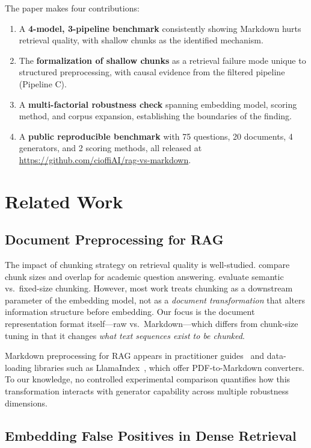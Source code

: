 \documentclass{article}
\begin{document}
The paper makes four contributions:

\begin{enumerate}
    \item A \textbf{4-model, 3-pipeline benchmark} consistently showing Markdown hurts retrieval quality, with shallow chunks as the identified mechanism.
    \item The \textbf{formalization of shallow chunks} as a retrieval failure mode unique to structured preprocessing, with causal evidence from the filtered pipeline (Pipeline C).
    \item A \textbf{multi-factorial robustness check} spanning embedding model, scoring method, and corpus expansion, establishing the boundaries of the finding.
    \item A \textbf{public reproducible benchmark} with 75 questions, 20 documents, 4 generators, and 2 scoring methods, all released at \url{https://github.com/cioffiAI/rag-vs-markdown}.
\end{enumerate}

\section{Related Work}

\subsection{Document Preprocessing for RAG}

The impact of chunking strategy on retrieval quality is well-studied. \citet{gao2023retrieval} compare chunk sizes and overlap for academic question answering. \citet{chen2024dense} evaluate semantic vs.\ fixed-size chunking. However, most work treats chunking as a downstream parameter of the embedding model, not as a \emph{document transformation} that alters information structure before embedding. Our focus is the document representation format itself---raw vs.\ Markdown---which differs from chunk-size tuning in that it changes \emph{what text sequences exist to be chunked}.

Markdown preprocessing for RAG appears in practitioner guides~\citep{openai2024rag,cursor2024} and data-loading libraries such as LlamaIndex~\citep{llamaindex}, which offer PDF-to-Markdown converters. To our knowledge, no controlled experimental comparison quantifies how this transformation interacts with generator capability across multiple robustness dimensions.

\subsection{Embedding False Positives in Dense Retrieval}
\end{document}
